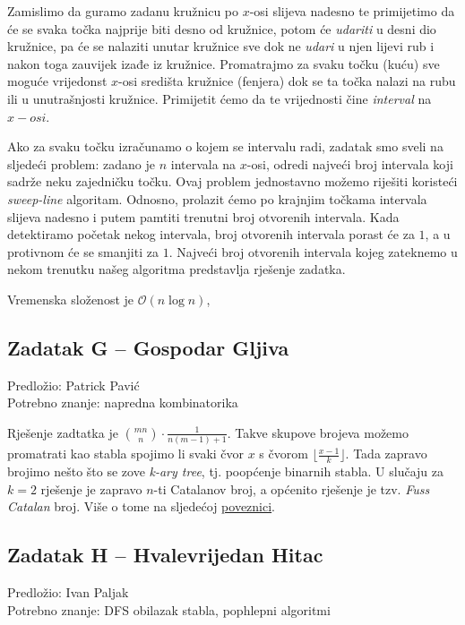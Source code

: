 \documentclass[a4paper]{article}
\begin{document}
Zamislimo da guramo zadanu kružnicu po $x$-osi slijeva nadesno te primijetimo
da će se svaka točka najprije biti desno od kružnice, potom će \textit{udariti}
u desni dio kružnice, pa će se nalaziti unutar kružnice sve dok ne
\textit{udari} u njen lijevi rub i nakon toga zauvijek izađe iz kružnice.
Promatrajmo za svaku točku (kuću) sve moguće vrijedonst $x$-osi središta
kružnice (fenjera) dok se ta točka nalazi na rubu ili u unutrašnjosti kružnice.
Primijetit ćemo da te vrijednosti čine \textit{interval} na $x-osi$.

Ako za svaku točku izračunamo o kojem se intervalu radi, zadatak smo sveli na
sljedeći problem: zadano je $n$ intervala na $x$-osi, odredi najveći broj
intervala koji sadrže neku zajedničku točku. Ovaj problem jednostavno možemo
riješiti koristeći \textit{sweep-line} algoritam. Odnosno, prolazit ćemo po
krajnjim točkama intervala slijeva nadesno i putem pamtiti trenutni broj
otvorenih intervala. Kada detektiramo početak nekog intervala, broj otvorenih
intervala porast će za $1$, a u protivnom će se smanjiti za $1$. Najveći broj
otvorenih intervala kojeg zateknemo u nekom trenutku našeg algoritma predstavlja
rješenje zadatka.

Vremenska složenost je $\mathcal{O}(n \log n)$,

\subsection*{Zadatak G -- Gospodar Gljiva}
\textsf{Predložio: Patrick Pavić}\\
\textsf{Potrebno znanje: napredna kombinatorika}

Rješenje zadtatka je ${mn \choose n} \cdot \frac{1}{n(m - 1) + 1}$. Takve
skupove brojeva možemo promatrati kao stabla spojimo li svaki čvor $x$ s čvorom
$\lfloor\frac{x - 1}{k}\rfloor$. Tada zapravo brojimo nešto što se zove \textit{k-ary tree}, tj.
poopćenje binarnih stabla. U slučaju za $k = 2$ rješenje je zapravo $n$-ti
Catalanov broj, a općenito rješenje je tzv. \textit{Fuss Catalan} broj. Više o tome na
sljedećoj \href{https://en.wikipedia.org/wiki/Fuss%E2%80%93Catalan_number}{poveznici}.

\subsection*{Zadatak H -- Hvalevrijedan Hitac}
\textsf{Predložio: Ivan Paljak}\\
\textsf{Potrebno znanje: DFS obilazak stabla, pophlepni algoritmi}
\end{document}
